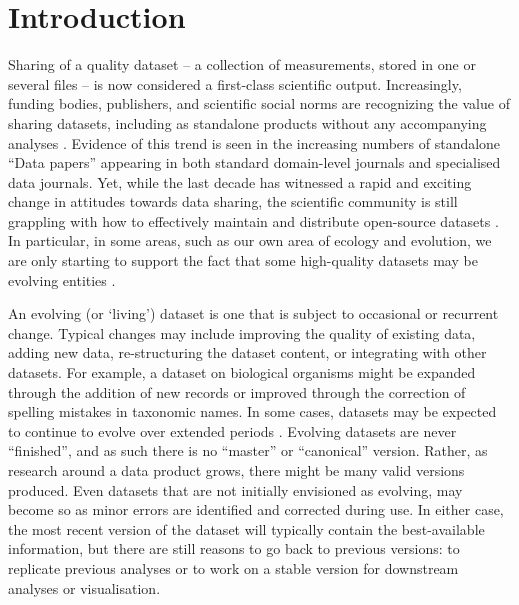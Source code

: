 \documentclass[a4paper,num-refs]{oup-contemporary}
\begin{document}
\newcommand{\smurl}[1]{\href{https://#1}{#1}}
\newcommand{\ghsmurl}[1]{\href{https://github.com/#1}{#1}}

\section{Introduction}

Sharing of a quality dataset -- a collection of measurements, stored in one or several files -- is now considered a first-class scientific output. Increasingly, funding bodies, publishers, and scientific social norms are recognizing the value of sharing datasets, including as standalone products without any accompanying analyses \cite{Whitlock-2011,Fairbairn-2011,Piwowar-2011,VanNoorden-2013,Gibney-2013}. Evidence of this trend is seen in the increasing numbers of standalone ``Data papers'' appearing in both standard domain-level journals and specialised data journals. Yet, while the last decade has witnessed a rapid and exciting change in attitudes towards data sharing, the scientific community is still grappling with how to effectively maintain and distribute open-source datasets \cite{Whitlock-2011, Goodman-2014, Force11-2014, Lowndes-2017, Perkel-2016, VanNoorden-2013, Kratz-2015,Wilkinson-2016, Yenni-2018}. In particular, in some areas, such as our own area of ecology and evolution, we are only starting to support the fact that some high-quality datasets may be evolving entities \cite{Yenni-2018}.

An evolving (or `living') dataset is one that is subject to occasional or recurrent change. Typical changes may include improving the quality of existing data, adding new data, re-structuring the dataset content, or integrating with other datasets. For example, a dataset on biological organisms might be expanded through the addition of new records or improved through the correction of spelling mistakes in taxonomic names. In some cases, datasets may be expected to continue to evolve over extended periods \cite[e.g.][]{Ernest-2018}. Evolving datasets are never ``finished'', and as such there is no ``master'' or ``canonical'' version. Rather, as research around a data product grows, there might be many valid versions produced. Even datasets that are not initially envisioned as evolving, may become so as minor errors are identified and corrected during use. In either case, the most recent version of the dataset will typically contain the best-available information, but there are still reasons to go back to previous versions: to replicate previous analyses or to work on a stable version for downstream analyses or visualisation.  
\end{document}
